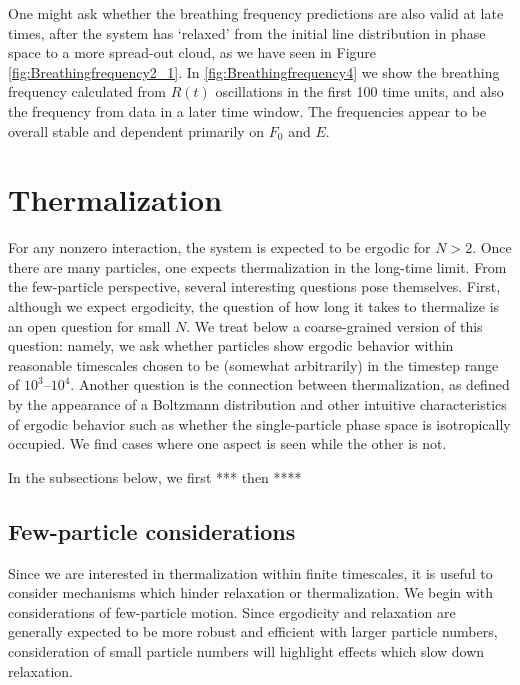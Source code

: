 \documentclass[aps,preprintnumbers,onecolumn,amsmath,amssymb,floatfix,pra]{revtex4-1}
\begin{document}
One might ask whether the breathing frequency predictions are also valid at late times, after the
system has `relaxed' from the initial line distribution in phase space to a more spread-out cloud,
as we have seen in Figure \ref{fig:Breathingfrequency2_1}.  In \ref{fig:Breathingfrequency4} we show
the breathing frequency calculated from $R(t)$ oscillations in the first 100 time units, and also
the frequency from data in a later time window. The frequencies appear to be overall stable and dependent
primarily on $F_0$ and $E$.  




\section{Thermalization}\label{section:Thermalization}


For any nonzero interaction, the system is expected to be ergodic for $N>2$.  Once there are many
particles, one expects thermalization in the long-time limit.  From the few-particle perspective,
several interesting questions pose themselves.  First, although we expect ergodicity, the question
of how long it takes to thermalize is an open question for small $N$. We treat below a
coarse-grained version of this question: namely, we ask whether particles show ergodic behavior
within reasonable timescales chosen to be (somewhat arbitrarily) in the timestep range of
$10^3$--$10^4$.  Another question is the connection between thermalization, as defined by the
appearance of a Boltzmann distribution and other intuitive characteristics of ergodic behavior such
as whether the single-particle phase space is isotropically occupied.  We find cases where one
aspect is seen while the other is not.  

In the subsections below, we first ***  then **** 






\subsection{Few-particle considerations}

Since we are interested in thermalization within finite timescales, it is useful to consider
mechanisms which hinder relaxation or thermalization.  We begin with considerations of few-particle
motion.  Since ergodicity and relaxation are generally expected to be more robust and efficient with
larger particle numbers, consideration of small particle numbers will highlight effects which slow
down relaxation.
\end{document}
